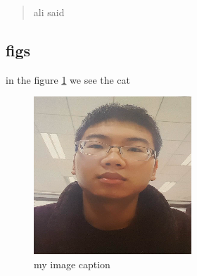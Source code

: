 \documentclass[a4paper,twocolumn]{article}
\begin{document}
\begin{quote}
	ali said
	
\end{quote}

\subsection{figs}
in the figure \ref{figrue of cat} we see the cat \\
\lipsum

\begin{figure}
	\includegraphics[width=\linewidth, angle=0,]{1_1_09_2f_37.png}
	\caption{my image caption}
	\label{figrue of cat} 
\end{figure}
\end{document}
